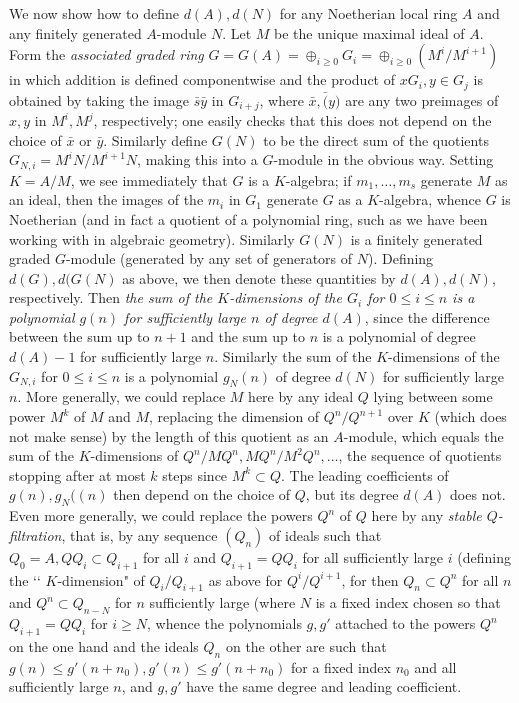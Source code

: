 \documentclass[10pt]{article}
\begin{document}
We now show how to define $d(A), d(N)$ for any Noetherian local ring $A$
and any finitely generated $A$-module $N$. Let $M$ be the unique maximal
ideal of $A$. Form the {\sl associated graded ring} $G=G(A) =
\oplus_{i\ge0} G_i = \oplus_{i\ge0} (M^i/M^{i+1})$ in which addition is
defined componentwise and the product of $x G_i,y\in G_j$ is obtained by
taking the image $\bar{s}\bar{y}$ in $G_{i+j}$, where $\bar{x},\bar(y)$
are any two preimages of $x,y$ in $M^i,M^j$, respectively; one easily
checks that this does not depend on the choice of $\bar{x}$ or
$\bar{y}$. Similarly define $G(N)$ to be the direct sum of the quotients
$G_{N,i} = M^i N/M^{i+1} N$, making this into a $G$-module in the
obvious way. Setting $K=A/M$, we see immediately that $G$ is a
$K$-algebra; if $m_1,\ldots,m_s$ generate $M$ as an ideal, then the
images of the $m_i$ in $G_1$ generate $G$ as a $K$-algebra, whence $G$
is Noetherian (and in fact a quotient of a polynomial ring, such as we
have been working with in algebraic geometry). Similarly $G(N)$ is a
finitely generated graded $G$-module (generated by any set of generators
of $N$). Defining $d(G),d(G(N)$ as above, we then denote these
quantities by $d(A),d(N)$, respectively. Then {\sl the sum of the
  $K$-dimensions of the $G_i$ for $0\le i\le n$ is a polynomial $g(n)$
  for sufficiently large $n$ of degree $d(A)$}, since the difference
between the sum up to $n+1$ and the sum up to $n$ is a polynomial of
degree $d(A) - 1$ for sufficiently large $n$. Similarly the sum of the
$K$-dimensions of the $G_{N,i}$ for $0\le i\le n$ is a polynomial
$g_N(n)$ of degree $d(N)$ for sufficiently large $n$. More generally, we
could replace $M$ here by any ideal $Q$ lying between some power $M^k$
of $M$ and $M$, replacing the dimension of $Q^n/Q^{n+1}$ over $K$ (which
does not make sense) by the length of this quotient as an $A$-module,
which equals the sum of the $K$-dimensions of $Q^n/MQ^n,
MQ^n/M^2Q^n,\ldots$, the sequence of quotients stopping after at most
$k$ steps since $M^k\subset Q$. The leading coefficients of
$g(n),g_N((n)$ then depend on the choice of $Q$, but its degree $d(A)$
does not. Even more generally, we could replace the powers $Q^n$ of $Q$
here by any {\sl stable $Q$-filtration}, that is, by any sequence
$(Q_n)$ of ideals such that $Q_0 = A, QQ_i\subset Q_{i+1}$ for all $i$
and $Q_{i+1}= QQ_i$ for all sufficiently large $i$ (defining the \lq\lq
$K$-dimension" of $Q_i/Q_{i+1}$ as above for $Q^i/Q^{i+1}$, for then
$Q_n\subset Q^n$ for all $n$ and $Q^n\subset Q_{n-N}$ for $n$
sufficiently large (where $N$ is a fixed index chosen so that $Q_{i+1} =
QQ_i$ for $i\ge N$, whence the polynomials $g,g'$ attached to the powers
$Q^n$ on the one hand and the ideals $Q_n$ on the other are such that
$g(n)\le g'(n+n_0), g'(n)\le g'(n+n_0)$ for a fixed index $n_0$ and all
sufficiently large $n$, and $g,g'$ have the same degree and leading
coefficient.
\end{document}
